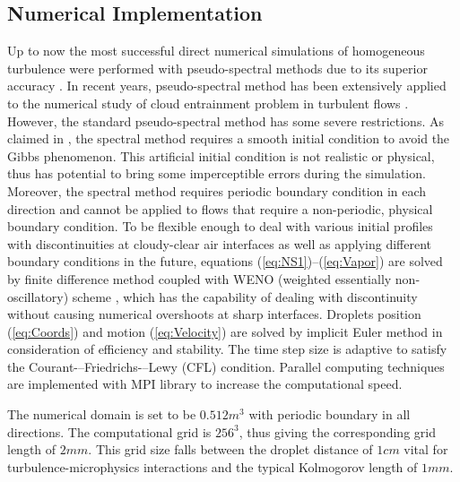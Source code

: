 \documentclass[12pt]{article}
\begin{document}
\subsection{Numerical Implementation}
Up to now the most successful direct numerical simulations of homogeneous 
turbulence were performed with pseudo-spectral methods due to its 
superior accuracy \cite{Rogallo81,Orszag72}. In recent years, pseudo-spectral 
method has been extensively applied to the numerical study of cloud 
entrainment problem in turbulent flows \cite{And04,Celani05,Kumar11}. However, the standard pseudo-spectral method has some severe restrictions. 
As claimed in \cite{Kumar11}, the spectral method requires a smooth initial condition to avoid the Gibbs phenomenon. This artificial initial condition is not realistic or physical, thus has potential to bring some imperceptible errors during the simulation. Moreover, the spectral method requires periodic boundary condition in each direction and cannot be applied to flows that require a non-periodic, physical boundary condition. To be flexible enough to deal with various initial profiles with discontinuities at cloudy-clear air interfaces as well as applying different boundary conditions in the future, equations (\ref{eq:NS1})--(\ref{eq:Vapor}) are solved by finite difference method coupled with WENO (weighted essentially non-oscillatory) scheme \cite{WENO96}, which has the capability of dealing with discontinuity without causing numerical overshoots at sharp interfaces. Droplets position (\ref{eq:Coords}) and motion (\ref{eq:Velocity}) are solved by implicit Euler method in consideration of efficiency and stability. The time step size is adaptive to satisfy the Courant-–Friedrichs-–Lewy (CFL) condition. Parallel computing techniques are implemented with MPI library to increase the computational speed.

The numerical domain is set to be $0.512m^{3}$ with periodic boundary
in all directions. The computational grid is $256^{3}$, thus
giving the corresponding grid length of $2mm$. This grid size falls
between the droplet distance of $1cm$ vital for turbulence-microphysics 
interactions and the typical Kolmogorov length of $1mm$.
\end{document}
